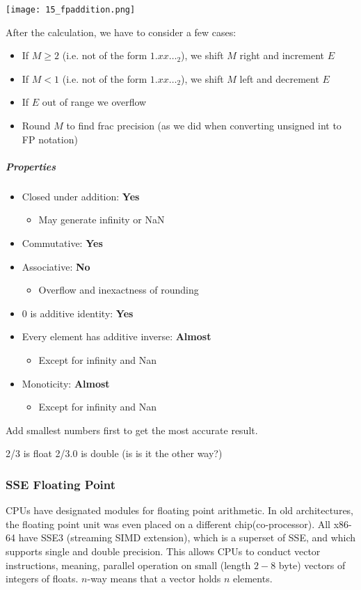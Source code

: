 \texttt{[image: 15\_fpaddition.png]}

After the calculation, we have to consider a few cases:
\begin{itemize}
    \item If $M \ge 2$ (i.e. not of the form $1.xx\dots_2$), we shift $M$ right and increment $E$
    \item If $M <  1$ (i.e. not of the form $1.xx\dots_2$), we shift $M$ left and decrement $E$
    \item If $E$ out of range we overflow
    \item Round $M$ to find frac precision (as we did when converting unsigned int to FP notation)
\end{itemize}

\subparagraph{Properties}
\begin{itemize}
    \item Closed under addition: \textbf{Yes}
        \begin{itemize}
            \item May generate infinity or NaN
        \end{itemize}
    \item Commutative: \textbf{Yes}
    \item Associative: \textbf{No}
        \begin{itemize}
            \item Overflow and inexactness of rounding
        \end{itemize}
    \item $0$ is additive identity: \textbf{Yes}
    \item Every element has additive inverse: \textbf{Almost}
        \begin{itemize}
            \item Except for infinity and Nan
        \end{itemize}
    \item Monoticity: \textbf{Almost}
        \begin{itemize}
            \item Except for infinity and Nan
        \end{itemize}
\end{itemize}

Add smallest numbers first to get the most accurate result.


2/3 is float
2/3.0 is double (is is it the other way?)

\subsubsection{SSE Floating Point}
CPUs have designated modules for floating point arithmetic. In old architectures, the floating point unit was even placed on a different chip(co-processor). All x86-64 have SSE3 (streaming SIMD extension), which is a superset of SSE, and which supports single and double precision. This allows CPUs to conduct vector instructions, meaning, parallel operation on small (length $2-8$ byte) vectors of integers of floats. $n$-way means that a vector holds $n$ elements.

